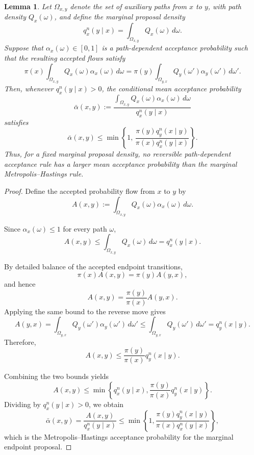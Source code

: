 \documentclass[12pt]{article}
\newtheorem{lemma}[theorem]{Lemma}
\theoremstyle{definition}
\theoremstyle{remark}
\theoremstyle{plain}
\begin{document}
\begin{lemma}
Let $\Omega_{x,y}$ denote the set of auxiliary paths from $x$ to $y$, with
path density $Q_x(\omega)$, and define the marginal proposal density
\[
q_x^n(y\mid x)
=
\int_{\Omega_{x,y}} Q_x(\omega)\,d\omega.
\]
Suppose that $\alpha_x(\omega)\in[0,1]$ is a path-dependent acceptance
probability such that the resulting accepted flows satisfy
\[
\pi(x)
\int_{\Omega_{x,y}}
Q_x(\omega)\alpha_x(\omega)\,d\omega
=
\pi(y)
\int_{\Omega_{y,x}}
Q_y(\omega')\alpha_y(\omega')\,d\omega'.
\]
Then, whenever $q_x^n(y\mid x)>0$, the conditional mean acceptance
probability
\[
\bar\alpha(x,y)
:=
\frac{
\int_{\Omega_{x,y}}
Q_x(\omega)\alpha_x(\omega)\,d\omega
}{
q_x^n(y\mid x)
}
\]
satisfies
\[
\bar\alpha(x,y)
\le
\min\left\{
1,\,
\frac{\pi(y)q_y^n(x\mid y)}
      {\pi(x)q_x^n(y\mid x)}
\right\}.
\]
Thus, for a fixed marginal proposal density, no reversible
path-dependent acceptance rule has a larger mean acceptance probability
than the marginal Metropolis--Hastings rule.
\end{lemma}

\begin{proof}
Define the accepted probability flow from $x$ to $y$ by
\[
A(x,y)
:=
\int_{\Omega_{x,y}}
Q_x(\omega)\alpha_x(\omega)\,d\omega.
\]

Since $\alpha_x(\omega)\le 1$ for every path $\omega$,
\[
A(x,y)
\le
\int_{\Omega_{x,y}}Q_x(\omega)\,d\omega
=
q_x^n(y\mid x).
\]

By detailed balance of the accepted endpoint transitions,
\[
\pi(x)A(x,y)=\pi(y)A(y,x),
\]
and hence
\[
A(x,y)=\frac{\pi(y)}{\pi(x)}A(y,x).
\]
Applying the same bound to the reverse move gives
\[
A(y,x)
=
\int_{\Omega_{y,x}}
Q_y(\omega')\alpha_y(\omega')\,d\omega'
\le
\int_{\Omega_{y,x}}Q_y(\omega')\,d\omega'
=
q_y^n(x\mid y).
\]
Therefore,
\[
A(x,y)
\le
\frac{\pi(y)}{\pi(x)}q_y^n(x\mid y).
\]

Combining the two bounds yields
\[
A(x,y)
\le
\min\left\{
q_x^n(y\mid x),
\frac{\pi(y)}{\pi(x)}q_y^n(x\mid y)
\right\}.
\]
Dividing by $q_x^n(y\mid x)>0$, we obtain
\[
\bar\alpha(x,y)
=
\frac{A(x,y)}{q_x^n(y\mid x)}
\le
\min\left\{
1,
\frac{\pi(y)q_y^n(x\mid y)}
      {\pi(x)q_x^n(y\mid x)}
\right\},
\]
which is the Metropolis--Hastings acceptance probability for the
marginal endpoint proposal.
\end{proof}


\end{document}
